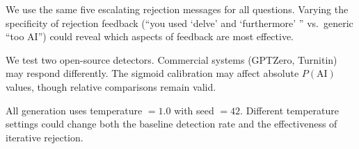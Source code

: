 We use the same five escalating rejection messages for all questions. Varying the specificity of rejection feedback (\eg ``you used `delve' and `furthermore' '' vs.\ generic ``too AI'') could reveal which aspects of feedback are most effective.

We test two open-source detectors. Commercial systems (GPTZero, Turnitin) may respond differently. The \binoculars sigmoid calibration may affect absolute $P(\text{AI})$ values, though relative comparisons remain valid.

All generation uses temperature $= 1.0$ with seed $= 42$. Different temperature settings could change both the baseline detection rate and the effectiveness of iterative rejection.
